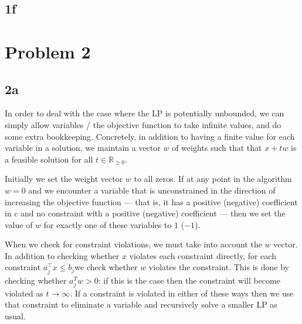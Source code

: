 \documentclass{article}
\newcommand{\constraintj}{$a_j^{\intercal}x \leq b_j$}
\begin{document}
\subsection*{1f}



\section*{Problem 2}
\subsection*{2a}

In order to deal with the case where the LP is potentially unbounded, we can simply 
allow variables / the objective function to take infinite values,
and do some extra bookkeeping. Concretely, in addition to having a finite value
for each variable in a solution, we maintain a vector $w$ of weights 
such that that $x + t w$ is a feasible solution for all $t \in \mathbb{R}_{\geq 0}$.

Initially we set the weight vector $w$ to all zeros. If at any point in the algorithm
$w = 0$ and we encounter a variable that is unconstrained
in the direction of increasing the objective function --- that is, it has a positive
(negative) coefficient in $c$ and no constraint with a positive (negative) coefficient
--- then we set the value of $w$ for exactly one of these variables to $1$ ($-1$).

When we check for constraint violations, we must take into account the $w$ vector.
In addition to checking whether $x$ violates each constraint directly, for each
constraint \constraintj we check whether $w$ violates the constraint. This is done
by checking whether $a_j^T w > 0$: if this is the case then the constraint will
become violated as $t \rightarrow \infty$. If a constraint is violated in either
of these ways then we use that constraint to eliminate a variable and recursively
solve a smaller LP as usual.
\end{document}
